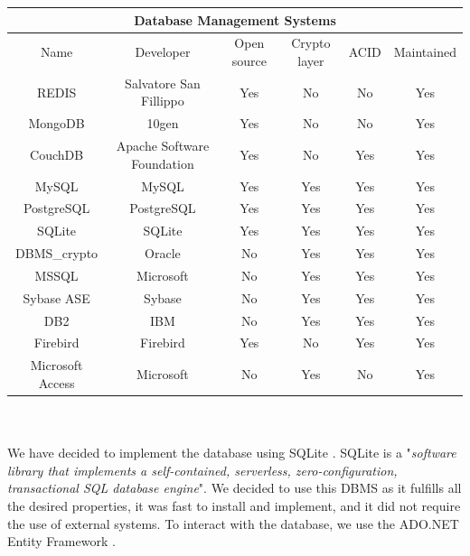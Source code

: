 \documentclass[a4paper]{report}
\begin{document}
\noindent \begin{tabular}{|c|ccccc|}
\multicolumn{6}{c}{Database Management Systems}\\\hline
Name & Developer & Open source & Crypto layer & ACID & Maintained\\\hline
REDIS\cite{redis} & Salvatore San Fillippo & Yes & No & No & Yes \\
MongoDB\cite{mongo} & 10gen& Yes & No & No & Yes \\
CouchDB\cite{couch} & Apache Software Foundation & Yes & No & Yes & Yes\\
MySQL\cite{mysqlcrypt} & MySQL & Yes & Yes & Yes & Yes\\
PostgreSQL\cite{postgre} & PostgreSQL & Yes & Yes & Yes & Yes\\
SQLite\cite{sqliteee} & SQLite & Yes & Yes & Yes & Yes\\ 
DBMS\_crypto\cite{dbmscrypto} & Oracle & No & Yes & Yes & Yes\\
MSSQL\cite{hsueh} & Microsoft & No & Yes & Yes & Yes\\
Sybase ASE\cite{sybase} & Sybase & No & Yes & Yes & Yes\\
DB2\cite{db2} & IBM & No & Yes & Yes & Yes \\
Firebird\cite{firebird} & Firebird & Yes & No & Yes & Yes\\
Microsoft Access\cite{access} & Microsoft & No & Yes & No & Yes\\\hline
\end{tabular} \\ \\

We have decided to implement the database using SQLite \cite{sqlite}. SQLite is a "\textit{software library that implements a self-contained, serverless, zero-configuration, transactional SQL database engine}"\cite{sqlite}. We decided to use this DBMS as it fulfills all the desired properties, it was fast to install and implement, and it did not require the use of external systems. To interact with the database, we use the ADO.NET Entity Framework \cite{adonet}.
\end{document}
